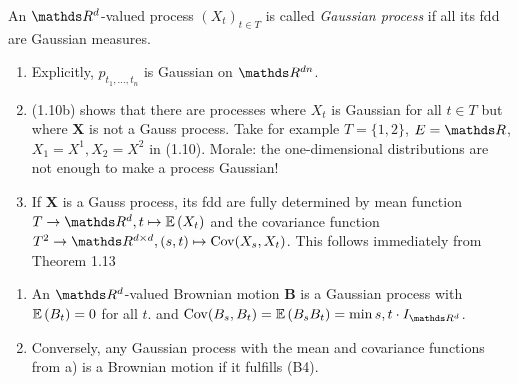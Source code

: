 \begin{defi}
An $\Rd$-valued process $(X_t)_{t \in T}$ is called \emph{Gaussian process} if all its fdd are Gaussian measures.
\end{defi}

\begin{bem}
\begin{enumerate}[label=(\alph*)]
\item Explicitly, $p_{t_1,\dots , t_n}$ is Gaussian on $\R^{dn}$.
\item (1.10b) shows that there are processes where $X_t$ is Gaussian for all $t\in T$ but where $\textbf{X}$ is not a Gauss process. Take for example $T=\{1,2\}$, $E=\R$, $X_1=X^1,X_2=X^2$ in (1.10).
Morale: the one-dimensional distributions are not enough to make a process Gaussian!
\item If $\textbf{X}$ is a Gauss process, its fdd are fully determined by mean function $T \to \Rd, t \mapsto \E{X_t}$ and the covariance function $T^2\to \R^{d\times d}, (s,t) \mapsto \Cov(X_s,X_t)$.
This follows immediately from Theorem 1.13
\end{enumerate}
\end{bem}

\begin{thm}
\begin{enumerate}[label=(\alph*)]
\item An $\Rd$-valued Brownian motion $\textbf{B}$ is a Gaussian process with $\mathbb{E}\left(B_t\right)=0$ for all $t$.
and $\Cov(B_s,B_t)=\E{B_sB_t}=\min{s,t} \cdot I_{\Rd}$.
\item Conversely, any Gaussian process with the mean and covariance functions from a) is a Brownian motion if it fulfills (B4).
\end{enumerate}
\end{thm}

